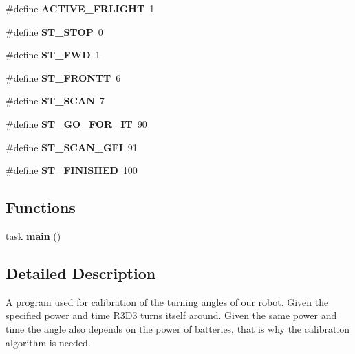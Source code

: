 \begin{DoxyCompactItemize}
\item 
\hypertarget{calibrate_8nxc_a4b9906c8adddf636daee1677e3172b90}{
\#define {\bfseries ACTIVE\_\-FRLIGHT}~1}
\label{calibrate_8nxc_a4b9906c8adddf636daee1677e3172b90}

\item 
\hypertarget{calibrate_8nxc_a8ccbe4f289c6182e18589c6f2c6108ee}{
\#define {\bfseries ST\_\-STOP}~0}
\label{calibrate_8nxc_a8ccbe4f289c6182e18589c6f2c6108ee}

\item 
\hypertarget{calibrate_8nxc_abba849981e74e84eb3836d3c03c363a9}{
\#define {\bfseries ST\_\-FWD}~1}
\label{calibrate_8nxc_abba849981e74e84eb3836d3c03c363a9}

\item 
\hypertarget{calibrate_8nxc_a82671cbfd87d61e73ed46e39a25ea515}{
\#define {\bfseries ST\_\-FRONTT}~6}
\label{calibrate_8nxc_a82671cbfd87d61e73ed46e39a25ea515}

\item 
\hypertarget{calibrate_8nxc_a3744009c444a7b62295fa027e1f42a15}{
\#define {\bfseries ST\_\-SCAN}~7}
\label{calibrate_8nxc_a3744009c444a7b62295fa027e1f42a15}

\item 
\hypertarget{calibrate_8nxc_af8e9dc0efb6c5ba062bc1fdace7300be}{
\#define {\bfseries ST\_\-GO\_\-FOR\_\-IT}~90}
\label{calibrate_8nxc_af8e9dc0efb6c5ba062bc1fdace7300be}

\item 
\hypertarget{calibrate_8nxc_a01eb7829648bea6bf8eaa82af9dacddb}{
\#define {\bfseries ST\_\-SCAN\_\-GFI}~91}
\label{calibrate_8nxc_a01eb7829648bea6bf8eaa82af9dacddb}

\item 
\hypertarget{calibrate_8nxc_a1c7e6cd43336e10d60f8c0635e8b7734}{
\#define {\bfseries ST\_\-FINISHED}~100}
\label{calibrate_8nxc_a1c7e6cd43336e10d60f8c0635e8b7734}

\end{DoxyCompactItemize}
\subsection*{Functions}
\begin{DoxyCompactItemize}
\item 
\hypertarget{calibrate_8nxc_a9a2af8e2cd81255d3bf384db4a382807}{
task {\bfseries main} ()}
\label{calibrate_8nxc_a9a2af8e2cd81255d3bf384db4a382807}

\end{DoxyCompactItemize}


\subsection{Detailed Description}
A program used for calibration of the turning angles of our robot. Given the specified power and time R3D3 turns itself around. Given the same power and time the angle also depends on the power of batteries, that is why the calibration algorithm is needed. 